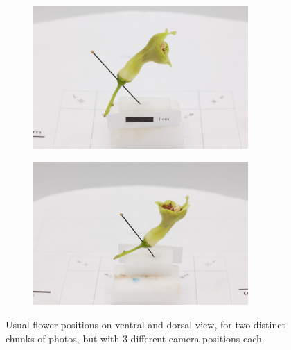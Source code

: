 \documentclass[10pt,letter,english]{article}
\begin{document}
\begin{figure}[H]
\centering
\begin{subfigure}[t]{.5\textwidth}
  \centering
  \includegraphics[width=0.9\textwidth]{Figures/position_2.jpg}
  \caption{}
  \label{}
\end{subfigure}%
\begin{subfigure}[t]{.5\textwidth}
  \centering
  \includegraphics[width=0.9\textwidth]{Figures/position_5.jpg}
  \caption{}
  \label{}
\end{subfigure}
\caption{Usual flower positions on ventral and dorsal view, for two distinct chunks of photos, but with 3 different camera positions each.}
\label{flowerplacement_3}
\end{figure}
\end{document}
